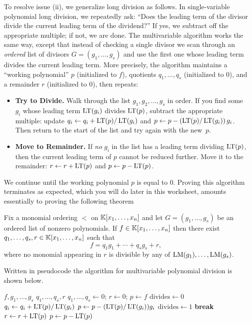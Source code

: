 \documentclass[12pt,reqno]{amsart}
\begin{document}
To resolve issue (ii), we generalize long division as follows. In single-variable polynomial long division, we repeatedly ask: ``Does the leading term of the divisor divide the current leading term of the dividend?'' If yes, we subtract off the appropriate multiple; if not, we are done. The multivariable algorithm works the same way, except that instead of checking a single divisor we scan through an \emph{ordered} list of divisors $G=(g_1,\ldots,g_s)$ and use the first one whose leading term divides the current leading term. More precisely, the algorithm maintains a ``working polynomial'' $p$ (initialized to $f$), quotients $q_1,\ldots,q_s$ (initialized to $0$), and a remainder $r$ (initialized to $0$), then repeats:
\begin{itemize}
\item \textbf{Try to Divide.} Walk through the list $g_1,g_2,\ldots,g_s$ in order. If you find some $g_i$ whose leading term $\operatorname{LT}(g_i)$ divides $\operatorname{LT}(p)$, subtract the appropriate multiple: update $q_i\leftarrow q_i+\operatorname{LT}(p)/\operatorname{LT}(g_i)$ and $p\leftarrow p-(\operatorname{LT}(p)/\operatorname{LT}(g_i))\,g_i$. Then return to the start of the list and try again with the new~$p$.

\item \textbf{Move to Remainder.} If \emph{no} $g_i$ in the list has a leading term dividing $\operatorname{LT}(p)$, then the current leading term of $p$ cannot be reduced further. Move it to the remainder: $r\leftarrow r+\operatorname{LT}(p)$ and $p\leftarrow p-\operatorname{LT}(p)$.
\end{itemize}
We continue until the working polynomial $p$ is equal to $0$. Proving this algorithm terminates as expected, which you will do later in this worksheet, amounts essentially to proving the following theorem

\begin{theorem}\label{thm:div-alg}
Fix a monomial ordering $<$ on $\mathbb{K}[x_1,\ldots,x_n]$ and let $G=(g_1,\ldots,g_s)$ be an ordered list of nonzero polynomials. If $f\in \mathbb{K}[x_1,\ldots,x_n]$ then there exist $q_1,\ldots,q_s,r\in \mathbb{K}[x_1,\ldots,x_n]$ such that
\[
f=q_1g_1+\cdots+q_sg_s+r,
\]
where no monomial appearing in $r$ is divisible by any of $\operatorname{LM}(g_1),\ldots,\operatorname{LM}(g_s)$. \end{theorem}

Written in pseudocode the algorithm for multivariable polynomial division is shown below.

\begin{algorithm}[H]
\caption{Division by an ordered list $G=(g_1,\ldots,g_s)$}
\begin{algorithmic}
\Require $f, g_1,\ldots,g_s$
\Ensure $q_1,\ldots,q_s,r$
\State $q_1,\ldots,q_s \gets 0$; $r\gets 0$; $p\gets f$
    \State $\mathrm{divides}\gets 0$
            \State $q_i\gets q_i+\operatorname{LT}(p)/\operatorname{LT}(g_i)$
            \State $p\gets p-(\operatorname{LT}(p)/\operatorname{LT}(g_i))g_i$
            \State $\mathrm{divides}\gets 1$
            \State \textbf{break}
        \EndIf
    \EndFor
        \State $r\gets r+\operatorname{LT}(p)$
        \State $p\gets p-\operatorname{LT}(p)$
    \EndIf
\EndWhile
\end{algorithmic}
\end{algorithm}
\end{document}
